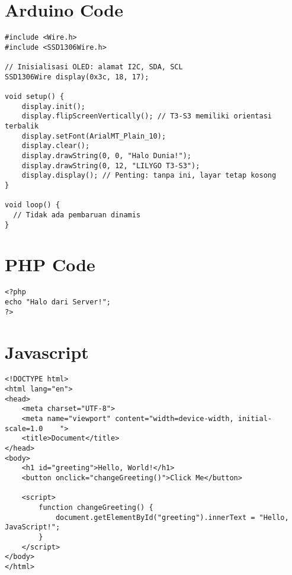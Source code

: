 
\section{Arduino Code}

\begin{minipage}{0.99\linewidth}
    \begin{lstlisting}[style=ArduinoStyle,caption={Program OLED Minimalis},label={lst:oled-simple}]
#include <Wire.h>
#include <SSD1306Wire.h>

// Inisialisasi OLED: alamat I2C, SDA, SCL
SSD1306Wire display(0x3c, 18, 17);

void setup() {
    display.init();
    display.flipScreenVertically(); // T3-S3 memiliki orientasi terbalik
    display.setFont(ArialMT_Plain_10);
    display.clear();
    display.drawString(0, 0, "Halo Dunia!");
    display.drawString(0, 12, "LILYGO T3-S3");
    display.display(); // Penting: tanpa ini, layar tetap kosong
}

void loop() {
  // Tidak ada pembaruan dinamis
}
\end{lstlisting}
\end{minipage}

\section{PHP Code}
\begin{minipage}{0.99\linewidth}
    \begin{lstlisting}[style=PHPStyle,caption={Endpoint PHP Minimalis},label={lst:php-simple}]
<?php
echo "Halo dari Server!";
?>
\end{lstlisting}
\end{minipage}


\section{Javascript}
\begin{minipage}{0.99\linewidth}
    \begin{lstlisting}[style=JavaScriptStyle,caption={Javascript Minimalis},label={lst:js-simple}]
<!DOCTYPE html>
<html lang="en">
<head>
    <meta charset="UTF-8">
    <meta name="viewport" content="width=device-width, initial-scale=1.0    ">
    <title>Document</title>
</head>
<body>
    <h1 id="greeting">Hello, World!</h1>
    <button onclick="changeGreeting()">Click Me</button>

    <script>
        function changeGreeting() {
            document.getElementById("greeting").innerText = "Hello, JavaScript!";
        }
    </script>
</body>
</html>
\end{lstlisting}
\end{minipage}


